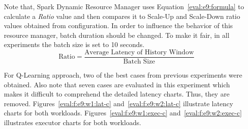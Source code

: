 Note that, Spark Dynamic Resource Manager uses Equation~\ref{eval:e9:formula} to calculate a \emph{Ratio} value and then compares it to Scale-Up and Scale-Down ratio values obtained from configuration. In order to influence the behavior of this resource manager, batch duration should be changed. To make it fair, in all experiments the batch size is set to 10 seconds.
\begin{equation}
\text{Ratio} = \frac{\text{Average Latency of History Window}}{\text{Batch Size}}
\label{eval:e9:formula}
\end{equation}

For Q-Learning approach, two of the best cases from previous experiments were obtained. Also note that seven cases are evaluated in this experiment which makes it difficult to comprehend the detailed latency charts. Thus, they are removed. Figures~\ref{eval:f:e9:w1:lat-c} and~\ref{eval:f:e9:w2:lat-c} illustrate latency charts for both workloads. Figures~\ref{eval:f:e9:w1:exec-c} and~\ref{eval:f:e9:w2:exec-c} illustrates executor charts for both workloads.

